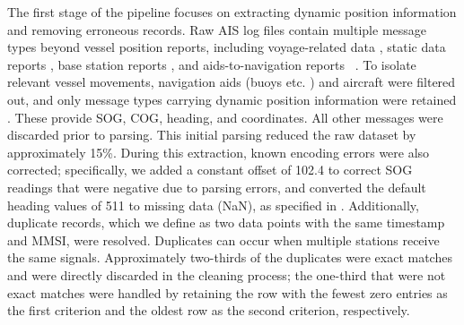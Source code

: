 The first stage of the pipeline focuses on extracting dynamic position information and removing erroneous records.
Raw \ac{AIS} log files contain multiple message types beyond vessel position reports, including voyage-related data%
, static data reports%
, base station reports%
, and aids-to-navigation reports%
~\parencite{itu-r-m1371-1-2001}. 
To isolate relevant vessel movements, navigation aids (buoys etc.%
) and aircraft were filtered out, and only message types carrying dynamic position information were retained%
. These provide \ac{SOG}, \ac{COG}, heading, and coordinates. All other messages were discarded prior to parsing. This initial parsing reduced the raw dataset by approximately 15\%. 
During this extraction, known encoding errors were also corrected; %
specifically, we added a constant offset of 102.4 to correct \ac{SOG} readings that were negative due to parsing errors, and converted the default heading values of 511 to missing data (NaN), as specified in \textcite{itu-r-m1371-1-2001}. %
Additionally, duplicate records, which we define as two data points with the same timestamp and \ac{MMSI}, were resolved. 
Duplicates can occur when multiple stations receive the same signals. Approximately two-thirds of the duplicates were exact matches and were directly discarded in the cleaning process; 
the one-third that were not exact matches were handled by retaining the row with the fewest zero entries as the first criterion and the oldest row as the second criterion, respectively.



